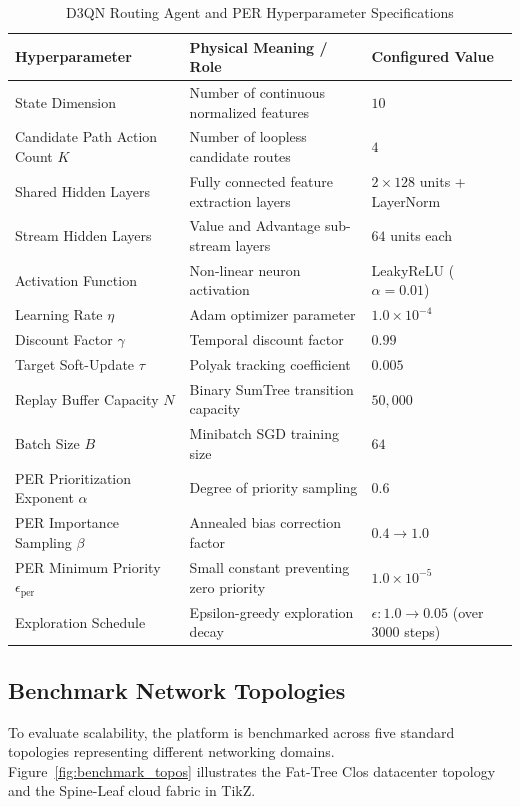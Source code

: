 \documentclass[12pt,a4paper,oneside]{report}
\begin{document}
\begin{table}[htbp]
\centering
\caption{D3QN Routing Agent and PER Hyperparameter Specifications}
\label{tab:hyperparameters}
\footnotesize
\begin{tabularx}{\textwidth}{l X l}
\toprule
\textbf{Hyperparameter} & \textbf{Physical Meaning / Role} & \textbf{Configured Value} \\
\midrule
State Dimension & Number of continuous normalized features & $10$ \\
Candidate Path Action Count $K$ & Number of loopless candidate routes & $4$ \\
Shared Hidden Layers & Fully connected feature extraction layers & $2 \times 128$ units + LayerNorm \\
Stream Hidden Layers & Value and Advantage sub-stream layers & $64$ units each \\
Activation Function & Non-linear neuron activation & LeakyReLU ($\alpha = 0.01$) \\
Learning Rate $\eta$ & Adam optimizer parameter & $1.0 \times 10^{-4}$ \\
Discount Factor $\gamma$ & Temporal discount factor & $0.99$ \\
Target Soft-Update $\tau$ & Polyak tracking coefficient & $0.005$ \\
Replay Buffer Capacity $N$ & Binary SumTree transition capacity & $50,000$ \\
Batch Size $B$ & Minibatch SGD training size & $64$ \\
PER Prioritization Exponent $\alpha$ & Degree of priority sampling & $0.6$ \\
PER Importance Sampling $\beta$ & Annealed bias correction factor & $0.4 \to 1.0$ \\
PER Minimum Priority $\epsilon_{\text{per}}$ & Small constant preventing zero priority & $1.0 \times 10^{-5}$ \\
Exploration Schedule & Epsilon-greedy exploration decay & $\epsilon: 1.0 \to 0.05$ (over 3000 steps) \\
\bottomrule
\end{tabularx}
\end{table}

\subsection{Benchmark Network Topologies}
To evaluate scalability, the platform is benchmarked across five standard topologies representing different networking domains. Figure~\ref{fig:benchmark_topos} illustrates the Fat-Tree Clos datacenter topology and the Spine-Leaf cloud fabric in TikZ.
\end{document}
